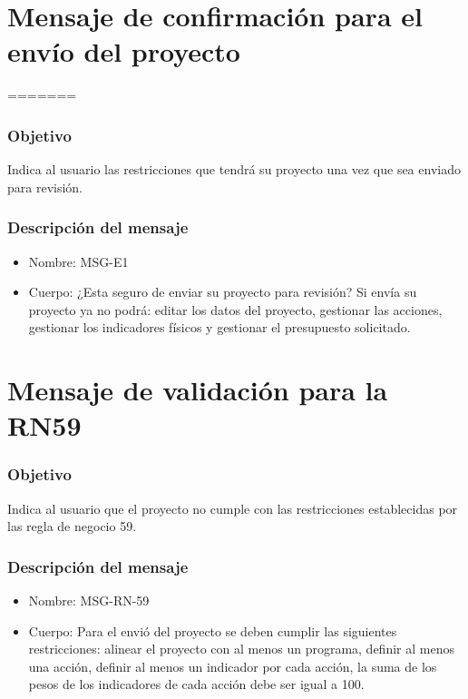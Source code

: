 \section{Mensaje de confirmación para el envío del proyecto} \label{MSGE1}

=======
\subsubsection{Objetivo}
Indica al usuario las restricciones que tendrá su proyecto una vez que sea enviado para revisión.

\subsubsection{Descripción del mensaje}
\begin{itemize}
\item Nombre: MSG-E1
\item Cuerpo: ¿Esta seguro de enviar su proyecto para revisión? Si envía su proyecto ya no podrá: editar los datos del proyecto, gestionar las acciones, gestionar los indicadores físicos y gestionar el presupuesto solicitado. 
\end{itemize}


\section{Mensaje de validación para la RN59} \label{MSG_RN59}

\subsubsection{Objetivo}
Indica al usuario que el proyecto no cumple con las restricciones establecidas por las regla de negocio 59.

\subsubsection{Descripción del mensaje}
\begin{itemize}
\item Nombre: MSG-RN-59
\item Cuerpo: Para el envió del proyecto se deben cumplir las siguientes restricciones: alinear el proyecto con al menos un programa, definir al menos una acción, definir al menos un indicador por cada acción, la suma de los pesos de los indicadores de cada acción debe ser igual a 100. 
\end{itemize}


